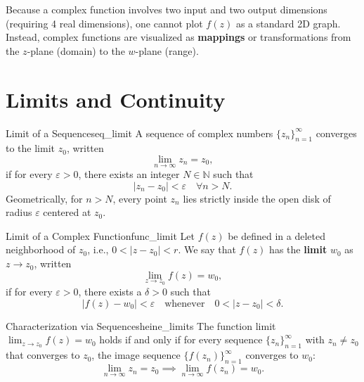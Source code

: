 \begin{remark}
Because a complex function involves two input and two output dimensions (requiring 4 real dimensions), one cannot plot $f(z)$ as a standard 2D graph. Instead, complex functions are visualized as \textbf{mappings} or transformations from the $z$-plane (domain) to the $w$-plane (range).
\end{remark}


\section{Limits and Continuity}

\begin{definition}{Limit of a Sequence}{seq_limit}
A sequence of complex numbers $\{z_n\}_{n=1}^\infty$ converges to the limit $z_0$, written
\begin{equation}
\lim_{n \to \infty} z_n = z_0,
\end{equation}
if for every $\varepsilon > 0$, there exists an integer $N \in \mathbb{N}$ such that
\begin{equation}
|z_n - z_0| < \varepsilon \quad \forall n > N.
\end{equation}
Geometrically, for $n > N$, every point $z_n$ lies strictly inside the open disk of radius $\varepsilon$ centered at $z_0$.
\end{definition}

\begin{definition}{Limit of a Complex Function}{func_limit}
Let $f(z)$ be defined in a deleted neighborhood of $z_0$, i.e., $0 < |z - z_0| < r$. We say that $f(z)$ has the \textbf{limit} $w_0$ as $z \to z_0$, written
\begin{equation}
\lim_{z \to z_0} f(z) = w_0,
\end{equation}
if for every $\varepsilon > 0$, there exists a $\delta > 0$ such that
\begin{equation}
|f(z) - w_0| < \varepsilon \quad \text{whenever} \quad 0 < |z - z_0| < \delta.
\end{equation}
\end{definition}

\begin{proposition}{Characterization via Sequences}{heine_limits}
The function limit $\lim_{z \to z_0} f(z) = w_0$ holds if and only if for every sequence $\{z_n\}_{n=1}^\infty$ with $z_n \neq z_0$ that converges to $z_0$, the image sequence $\{f(z_n)\}_{n=1}^\infty$ converges to $w_0$:
\begin{equation}
\lim_{n \to \infty} z_n = z_0 \implies \lim_{n \to \infty} f(z_n) = w_0.
\end{equation}
\end{proposition}


